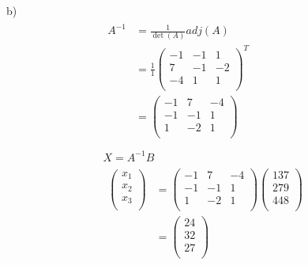 \documentclass{article}
\begin{document}
b)
\begin{gather*}
  \begin{split}
    A^{-1} &= \frac{1}{\det(A)} adj(A) \\
           &= \frac{1}{1} \begin{pmatrix}
                            -1 & -1 & 1 \\
                            7 & -1 & -2 \\
                            -4 & 1 & 1 \\ 
                          \end{pmatrix}^T \\
           &= \begin{pmatrix}
                -1 & 7 & -4 \\
                -1 & -1 & 1 \\
                1 & -2 & 1 \\ 
              \end{pmatrix} \\
  \end{split} \\
  X = A^{-1}B \\
  \begin{split}
    \begin{pmatrix}
      x_1 \\
      x_2 \\
      x_3 \\
    \end{pmatrix} 
    &= \begin{pmatrix}
         -1 & 7 & -4 \\
         -1 & -1 & 1 \\
         1 & -2 & 1 \\
       \end{pmatrix}
       \begin{pmatrix}
         137 \\
         279 \\
         448 \\
       \end{pmatrix} \\
    &= \begin{pmatrix}
         24 \\
         32 \\
         27 \\
       \end{pmatrix} \\
  \end{split} \\
\end{gather*}
\end{document}
